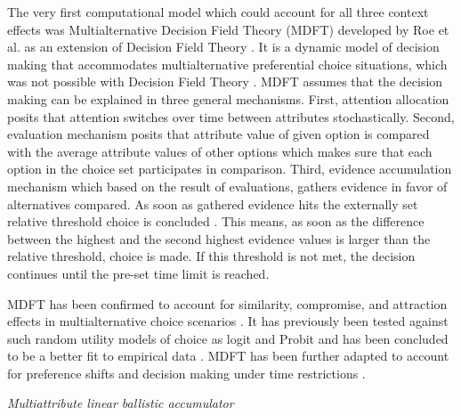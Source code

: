 \documentclass[a4paper,12pt]{article}
\newcommand{\citeyearonly}[1]{\citeyearpar{#1}}
\begin{document}
The very first computational model which could account for all three context effects was Multialternative Decision Field Theory (MDFT) developed by Roe et al. \citeyearonly{roe2001multialternative} as an extension of Decision Field Theory \citep{busemeyer1993decision}. It is a dynamic model of decision making that accommodates multialternative preferential choice situations, which was not possible with Decision Field Theory \citep{hotaling2019quantitative}. MDFT assumes that the decision making can be explained in three general mechanisms. First, attention allocation posits that attention switches over time between attributes stochastically. Second, evaluation mechanism posits that attribute value of given option is compared with the average attribute values of other options  which makes sure that each option in the choice set participates in comparison. Third, evidence accumulation mechanism which based on the result of evaluations, gathers evidence in favor of alternatives compared. As soon as gathered evidence hits the externally set relative threshold choice is concluded \citep{busemeyer2002survey}. This means, as soon as the difference between the highest and the second highest evidence values is larger than the relative threshold, choice is made. If this threshold is not met, the decision continues until the pre-set time limit is reached.

MDFT has been confirmed to account for similarity, compromise, and attraction effects in multialternative choice scenarios \citep{roe2001multialternative}. It has previously been tested against such random utility models of choice as logit and Probit and has been concluded to be a better fit to empirical data \citep{berkowitsch2014rigorously}. 
MDFT has been further adapted to account for preference shifts \citep{mohr2017attraction} and decision making under time restrictions \citep{diederich2003mdft}.

\textit{Multiattribute linear ballistic accumulator}
\end{document}
